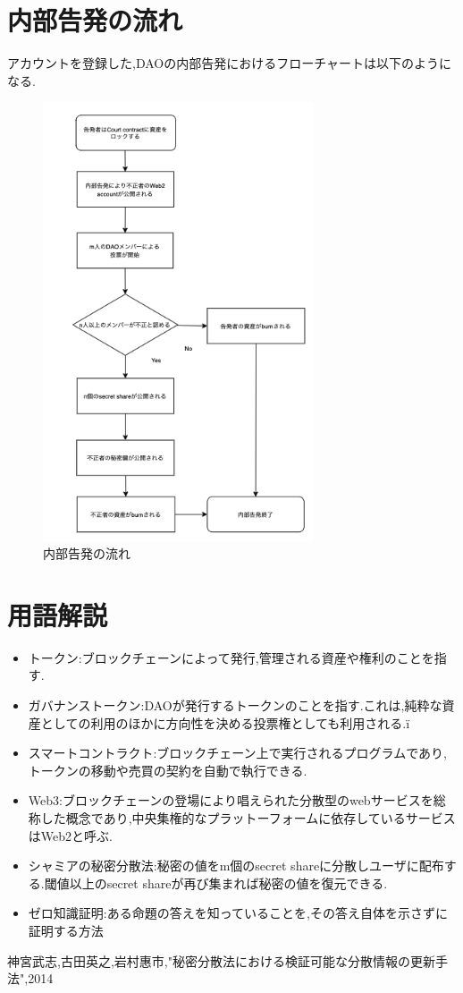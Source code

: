 \documentclass[twocolumn,a4j]{jarticle}
\begin{document}
\section{内部告発の流れ}
アカウントを登録した,DAOの内部告発におけるフローチャートは以下のようになる.
\begin{figure}[htbp]
  \begin{center}
    \includegraphics[width=80mm]{flow.png}
    \caption{内部告発の流れ}
  \end{center}
\end{figure}

\section{用語解説}
\begin{itemize}
  \item トークン:ブロックチェーンによって発行,管理される資産や権利のことを指す.
  \item ガバナンストークン:DAOが発行するトークンのことを指す.これは,純粋な資産としての利用のほかに方向性を決める投票権としても利用される.ï
  \item スマートコントラクト:ブロックチェーン上で実行されるプログラムであり,トークンの移動や売買の契約を自動で執行できる.
  \item Web3:ブロックチェーンの登場により唱えられた分散型のwebサービスを総称した概念であり,中央集権的なプラットーフォームに依存しているサービスはWeb2と呼ぶ.
  \item シャミアの秘密分散法:秘密の値をm個のsecret shareに分散しユーザに配布する.閾値以上のsecret shareが再び集まれば秘密の値を復元できる.
  \item ゼロ知識証明:ある命題の答えを知っていることを,その答え自体を示さずに証明する方法
\end{itemize}


\begin{thebibliography}{99}
   神宮武志,古田英之,岩村惠市,"秘密分散法における検証可能な分散情報の更新手法",2014
\end{thebibliography}
\end{document}
